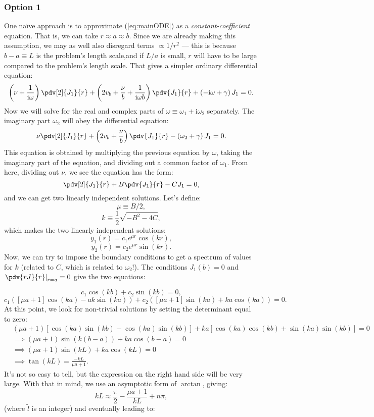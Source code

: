 \subsubsection{Option 1}
One na\"{i}ve approach is to approximate (\ref{eq:mainODE}) as a \textit{constant-coefficient} equation.  That is, we can take $r\approx a \approx b$.  Since we are already making this assumption, we may as well also disregard terms $\propto 1 / r^2$ --- this is because $b-a \equiv L$ is the problem's length scale,and if $L/a$ is small, $r$ will have to be large compared to the problem's length scale.  That gives a simpler ordinary differential equation:
\begin{equation*}
\left(\nu +\frac{1}{\mathrm{i}\omega}\right)\pdv[2]{J_1}{r}+\left(2v_b+\frac{\nu}{b}+\frac{1}{\mathrm{i}\omega b}\right)\pdv{J_1}{r} + \left(-\mathrm{i}\omega+\gamma\right)J_1=0.
\end{equation*}
Now we will solve for the real and complex parts of $\omega\equiv \omega_1 + \mathrm{i} \omega_2$ separately.  The imaginary part $\omega_2$ will obey the differential equation:
\begin{equation*}
\nu \pdv[2]{J_1}{r}+\left(2v_b+\frac{\nu}{b}\right)\pdv{J_1}{r} - \left(\omega_2 + \gamma \right)J_1 = 0.
\end{equation*}
This equation is obtained by multiplying the previous equation by $\omega$, taking the imaginary part of the equation, and dividing out a common factor of $\omega_1$.  From here, dividing out $\nu$, we see the equation has the form:
\[ \pdv[2]{J_1}{r} + B\pdv{J_1}{r} - CJ_1=0,\]
and we can get two linearly independent solutions.  Let's define:
\[ \mu \equiv B/2, \]
\[ k \equiv \frac{1}{2}\sqrt{-B^2 -4C},\]
which makes the two linearly independent solutions:
\[ y_1(r)=c_1 e^{\mu r}\cos(k r),\]
\[ y_2(r)=c_2 e^{\mu r} \sin(k r ).\]
Now, we can try to impose the boundary conditions to get a spectrum of values for $k$ (related to $C$, which is related to $\omega_2$!).  The conditions $J_1(b)=0$ and $\left.\pdv{rJ}{r}\right|_{r=a} = 0$ give the two equations:

\[ c_1 \cos(kb) + c_2 \sin(kb) = 0, \]
\[  c_1\left( \left[\mu a + 1\right]\cos(ka) - ak\sin(ka) \right) + c_2\left(\left[\mu a + 1\right]\sin(ka) + ka \cos(ka) \right) = 0.\]
At this point, we look for non-trivial solutions by setting the determinant equal to zero:
\begin{align*}
& \left(\mu a + 1\right)\left[\cos(ka)\sin(kb) - \cos(ka)\sin(kb)\right] + ka\left[\cos(ka)\cos(kb) + \sin(ka)\sin(kb) \right] = 0 \\
&\implies \left(\mu a + 1 \right)\sin(k(b-a)) + ka\cos(b-a) = 0 \\
&\implies \left(\mu a + 1 \right)\sin(kL) + ka \cos(kL) = 0 \\
&\implies \tan(kL) = \frac{-kL}{\mu a + 1}.
\end{align*}
It's not so easy to tell, but the expression on the right hand side will be very large. With that in mind, we use an asymptotic form of $\arctan$, giving:
\[kL \approx \frac{\pi}{2} - \frac{\mu a + 1}{kL} + n\pi,\]
(where $\tilde{l}$ is an integer) and eventually leading to:

